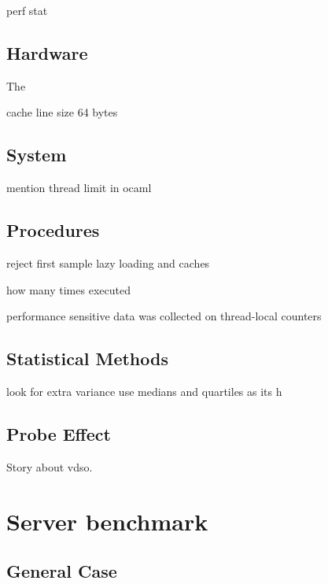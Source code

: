 \documentclass[12pt,a4paper,twoside]{report}
\begin{document}
perf stat

\subsection{Hardware}
The 

cache line size 64 bytes

\subsection{System}
\label{section:methods_system}
mention thread limit in ocaml
\subsection{Procedures}
reject first sample lazy loading and caches

how many times executed

performance sensitive data was collected on thread-local counters

\subsection{Statistical Methods}

look for extra variance
use medians and quartiles as its h
\subsection{Probe Effect}

Story about vdso.







\section{Server benchmark} 

\subsection{General Case}
\label{section:benchmark-general-case}
\end{document}
